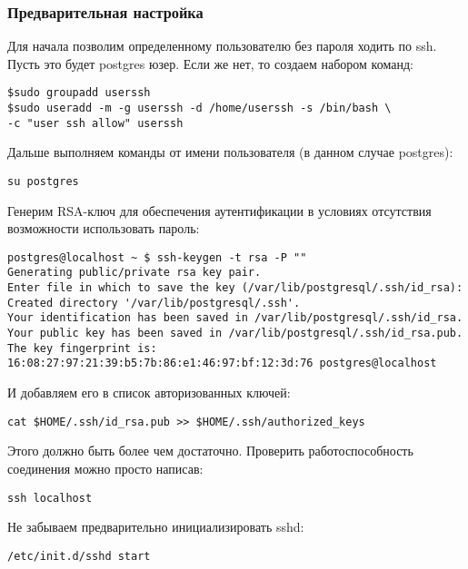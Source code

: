 \subsubsection{Предварительная настройка}
Для начала позволим определенному пользователю без пароля ходить по ssh. Пусть это будет postgres юзер. 
Если же нет, то создаем набором команд:
\begin{lstlisting}[label=lst:streaming1,caption=Создаем пользователя userssh]
$sudo groupadd userssh
$sudo useradd -m -g userssh -d /home/userssh -s /bin/bash \
-c "user ssh allow" userssh
\end{lstlisting}

Дальше выполняем команды от имени пользователя (в данном случае postgres):
\begin{lstlisting}[label=lst:streaming2,caption=Логинимся под пользователем postgres]
su postgres
\end{lstlisting}

Генерим RSA-ключ для обеспечения аутентификации в условиях отсутствия возможности использовать пароль:
\begin{lstlisting}[label=lst:streaming3,caption=Генерим RSA-ключ]
postgres@localhost ~ $ ssh-keygen -t rsa -P ""
Generating public/private rsa key pair.
Enter file in which to save the key (/var/lib/postgresql/.ssh/id_rsa): 
Created directory '/var/lib/postgresql/.ssh'.
Your identification has been saved in /var/lib/postgresql/.ssh/id_rsa.
Your public key has been saved in /var/lib/postgresql/.ssh/id_rsa.pub.
The key fingerprint is:
16:08:27:97:21:39:b5:7b:86:e1:46:97:bf:12:3d:76 postgres@localhost
\end{lstlisting}

И добавляем его в список авторизованных ключей:
\begin{lstlisting}[label=lst:streaming4,caption=Добавляем его в список авторизованных ключей]
cat $HOME/.ssh/id_rsa.pub >> $HOME/.ssh/authorized_keys
\end{lstlisting}

Этого должно быть более чем достаточно. Проверить работоспособность соединения можно просто написав:
\begin{lstlisting}[label=lst:streaming5,caption=Пробуем зайти на ssh без пароля]
ssh localhost
\end{lstlisting}

Не забываем предварительно инициализировать sshd:
\begin{lstlisting}[label=lst:streaming6,caption=Запуск sshd]
/etc/init.d/sshd start
\end{lstlisting}

